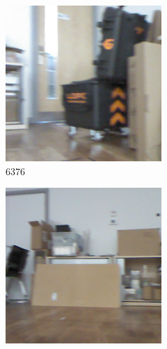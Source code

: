 \documentclass{article}
\begin{document}
\begin{figure}[H]
  \centering
  \begin{subfigure}[b]{0.3\textwidth}
    \includegraphics[width=\textwidth]{../bestimages/2019-01-31-14-42-03-236518.png}
    \caption{6376}
  \end{subfigure}
  \begin{subfigure}[b]{0.3\textwidth}
    \includegraphics[width=\textwidth]{../bestimages/2019-01-31-14-43-51-731422.png}

\end{subfigure}
\end{figure}
\end{document}
